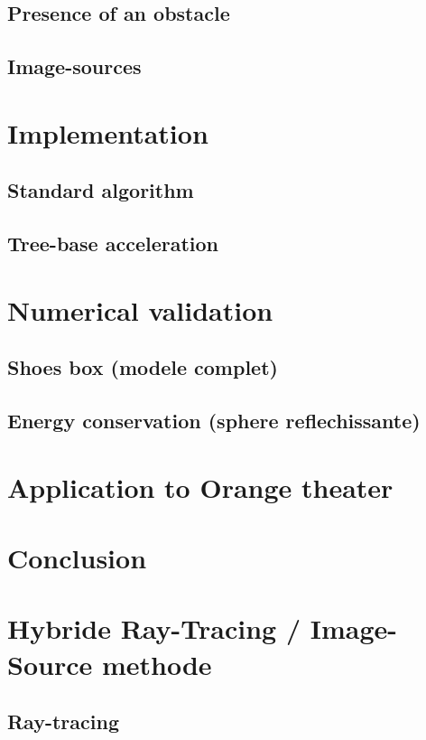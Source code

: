 \documentclass[AMA,STIX1COL]{WileyNJD-v2}
\begin{document}
\subsection{Presence of an obstacle}


\subsection{Image-sources}




\section{Implementation}
\subsection{Standard algorithm}
\subsection{Tree-base acceleration}

\section{Numerical validation}
\subsection{Shoes box (modele complet)}
\subsection{Energy conservation (sphere reflechissante)}

\section{Application to Orange theater}

\section{Conclusion}





\section{Hybride Ray-Tracing / Image-Source methode}\label{sec3}
\subsection{Ray-tracing \cite{raytracing}}
\end{document}
